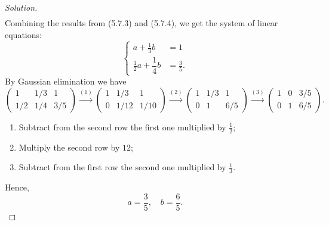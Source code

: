 \documentclass{article}[12pt]
\newenvironment{solution}
  {\renewcommand\qedsymbol{$\blacksquare$}\begin{proof}[Solution]}
  {\end{proof}}
\begin{document}
\begin{solution}
\begin{align*}
\end{align*}
Combining the results from (5.7.3) and (5.7.4), we get the system of linear equations:
\begin{equation*}
    \begin{cases}
        a + \frac{1}{3}b &= 1
        \\
        \frac{1}{2}a +  \dfrac{1}{4}b &= \frac{3}{5}.
    \end{cases}
\end{equation*}
By Gaussian elimination we have
\begin{equation*}
    \begin{pmatrix} 1 & 1/3 & 1 \\ 1/2 & 1/4 & 3/5 \end{pmatrix} \stackrel{(1)}{\longrightarrow} \begin{pmatrix} 1 & 1/3 & 1 \\ 0 & 1/12 & 1/10 \end{pmatrix} \stackrel{(2)}{\longrightarrow} \begin{pmatrix} 1 & 1/3 & 1 \\ 0 & 1 & 6/5 \end{pmatrix} \stackrel{(3)}{\longrightarrow}\begin{pmatrix} 1 & 0 & 3/5 \\ 0 & 1 & 6/5 \end{pmatrix}.
\end{equation*}
\begin{enumerate}[label=(\arabic*)]
    \item Subtract from the second row the first one multiplied by $\tfrac{1}{2}$;
    \item Multiply the second row by $12$;
    \item Subtract from the first row the second one multiplied by $\tfrac{1}{3}$.
\end{enumerate}
Hence,
\begin{equation*}
    a = \dfrac{3}{5},\quad b = \dfrac{6}{5}.
\end{equation*}
\end{solution}
\end{document}
